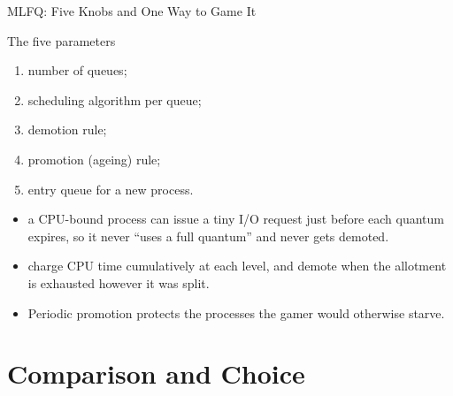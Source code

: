 \documentclass[aspectratio=169]{beamer}
\begin{document}
\begin{frame}{MLFQ: Five Knobs and One Way to Game It}
  \begin{block}{The five parameters}
    \begin{enumerate}
      \item number of queues;
      \item scheduling algorithm per queue;
      \item demotion rule;
      \item promotion (ageing) rule;
      \item entry queue for a new process.
    \end{enumerate}
  \end{block}
  \begin{itemize}
    \item {} a CPU-bound process can issue a tiny I/O request
      just before each quantum expires, so it never ``uses a full quantum''
      and never gets demoted.
    \item {} charge CPU time cumulatively at each level, and
      demote when the allotment is exhausted however it was split.
    \item Periodic promotion protects the processes the gamer would
      otherwise starve.
  \end{itemize}
\end{frame}

\section{Comparison and Choice}

\end{document}
